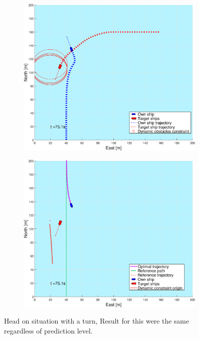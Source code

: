 \begin{figure}[ht!]
\begin{subfigure}[b]{0.494\textwidth}
        \subcaption{}
    \end{subfigure}
    \hfill
    \\
    \begin{subfigure}[b]{0.494\textwidth}
        \centering
        \includegraphics[width=\textwidth]{Images/Figures/sving_HO/_Simple_0fig1_time=75}
        \subcaption{}
    \end{subfigure}
    \hfill
    \begin{subfigure}[b]{0.494\textwidth}
        \centering
        \includegraphics[width=\textwidth]{Images/Figures/sving_HO/_Simple_0fig999_time=75}
        \subcaption{}
    \end{subfigure}
    \hfill
    \caption{Head on situation with a turn, Result for this were the same regardless of prediction level.}
    \label{FIG: Turn HO}
\end{figure}%
